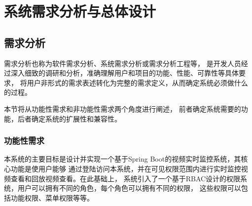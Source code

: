 

\chapter{系统需求分析与总体设计}

\section{需求分析}

需求分析也称为软件需求分析、系统需求分析或需求分析工程等，
是开发人员经过深入细致的调研和分析，准确理解用户和项目的功能、性能、可靠性等具体要求，
将用户非形式的需求表述转化为完整的需求定义，从而确定系统必须做什么的过程。\cite{demand_analysis}

本节将从功能性需求和非功能性需求两个角度进行阐述，
前者确定系统需要的功能，后者确定系统的扩展性和兼容性。

\subsection{功能性需求}
本系统的主要目标是设计并实现一个基于Spring Boot的视频实时监控系统，其核心功能是使用户能够
通过登陆访问本系统，并在可见权限范围内进行实时监控视频查看和回放视频查看。在此基础上，
系统引入了一个基于RBAC设计的权限系统，用户可以拥有不同的角色，每个角色可以拥有不同的权限，
这些权限可以包括功能权限、菜单权限等等。

